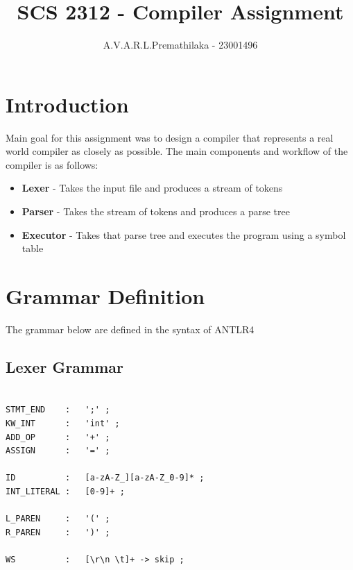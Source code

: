 \documentclass[12pt,a4paper]{article}
\title{SCS 2312 - Compiler Assignment }
\author{A.V.A.R.L.Premathilaka - 23001496}
\begin{document}
\maketitle
\tableofcontents
\newpage

\section{Introduction}
Main goal for this assignment was to design a compiler that represents a real world compiler as closely as possible. The main components and workflow of the compiler is as follows:
\begin{itemize}
    \item \textbf{Lexer} - Takes the input file and produces a stream of tokens
    \item \textbf{Parser} - Takes the stream of tokens and produces a parse tree
    \item \textbf{Executor} - Takes that parse tree and executes the program using a symbol table
\end{itemize}

\section{Grammar Definition}
The grammar below are defined in the syntax of ANTLR4

\subsection{Lexer Grammar}
\begin{verbatim}

STMT_END    :   ';' ;
KW_INT      :   'int' ;
ADD_OP      :   '+' ;
ASSIGN      :   '=' ;

ID          :   [a-zA-Z_][a-zA-Z_0-9]* ;
INT_LITERAL :   [0-9]+ ;

L_PAREN     :   '(' ;
R_PAREN     :   ')' ;

WS          :   [\r\n \t]+ -> skip ;
\end{verbatim}
\end{document}
